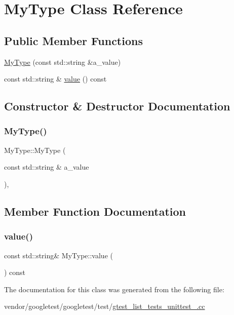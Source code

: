 \hypertarget{class_my_type}{}\section{My\+Type Class Reference}
\label{class_my_type}
\subsection*{Public Member Functions}
\begin{DoxyCompactItemize}
\item 
\hyperlink{class_my_type_a74d6f29a06e298321a6e5f0b91b020e7}{My\+Type} (const std\+::string \&a\+\_\+value)
\item 
const std\+::string \& \hyperlink{class_my_type_a04eaace57f0ecd8ee8898defbdee31b4}{value} () const
\end{DoxyCompactItemize}


\subsection{Constructor \& Destructor Documentation}
\mbox{\label{class_my_type_a74d6f29a06e298321a6e5f0b91b020e7}} 
\subsubsection{\texorpdfstring{My\+Type()}{MyType()}}
{\footnotesize\ttfamily My\+Type\+::\+My\+Type (\begin{DoxyParamCaption}\item[{const std\+::string \&}]{a\+\_\+value }\end{DoxyParamCaption})\hspace{0.3cm}{\ttfamily [inline]}, {\ttfamily [explicit]}}



\subsection{Member Function Documentation}
\mbox{\label{class_my_type_a04eaace57f0ecd8ee8898defbdee31b4}} 
\subsubsection{\texorpdfstring{value()}{value()}}
{\footnotesize\ttfamily const std\+::string\& My\+Type\+::value (\begin{DoxyParamCaption}{ }\end{DoxyParamCaption}) const\hspace{0.3cm}{\ttfamily [inline]}}



The documentation for this class was generated from the following file\+:\begin{DoxyCompactItemize}
\item 
vendor/googletest/googletest/test/\hyperlink{gtest__list__tests__unittest___8cc}{gtest\+\_\+list\+\_\+tests\+\_\+unittest\+\_\+.\+cc}\end{DoxyCompactItemize}
